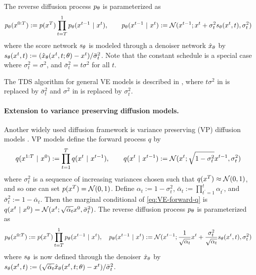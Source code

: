 The reverse diffusion process $p_{\theta}$ is parameterized as  
\begin{align}
    p_{\theta}(x^{0:T}) :=p(x^{T}) \prod_{t=T}^{1}p_{\theta}(x^{t-1} ~\vert~ x^{t}), \qquad 
    p_{\theta}(x^{t-1} ~\vert~ x^{t} ) := \mathcal{N}(x^{t-1}; x^{t} + \sigma_t^2 s_\theta (x^{t}, t), \sigma_t^2)
\end{align}
where the score network $s_\theta$ is modeled through a denoiser network ${\hat x}_\theta$ by $s_\theta(x^{t}, t) := ({\hat x}_\theta (x^{t}, t; \theta) - x^{t} )/\bar \sigma_t^2$.
Note that the constant schedule is a special case where $\sigma_t^2=\sigma^2$, and $\bar \sigma_t^2=t\sigma^2$ for all $t$. 

The TDS algorithm for general VE models is described in , where $t\sigma^2$ in  is replaced by $\bar \sigma_t^2$ and $\sigma^2$ in  is replaced by $\sigma_t^2$. 



\paragraph{Extension to variance preserving diffusion models.}  Another widely used diffusion framework is variance preserving (VP) diffusion models \citep{ho2020denoising}. VP models define the forward process $q$ by 
\begin{align}\label{eq:VP-forward-q}
q(x^{1:T} ~\vert~ x^{0}):=\prod_{t=1}^T q(x^{t} ~\vert~ x^{t-1}), \qquad 
    q(x^{t} ~\vert~ x^{t-1}) := \mathcal{N}(x^{t}; \sqrt{1-\sigma_t^2}x^{t-1}, \sigma_t^2)
\end{align}
where $\sigma_t^2$ is  a sequence of increasing variances chosen such that $q(x^{T}) \approx \mathcal{N}(0,1)$, and so one can set $p(x^{T}) = \mathcal{N}(0,1)$. Define $\alpha_t := 1-\sigma_t^2$,  $\bar \alpha_t := \prod_{t^\prime=1}^t\alpha_{t^\prime}$, and $\bar \sigma_t^2:=1-\bar \alpha_t$. 
Then the marginal conditional of \cref{eq:VE-forward-q} is $q(x^{t} ~\vert~ x^{0}) = \mathcal{N}(x^{t}; \sqrt{\bar \alpha_t} x^{0}, \bar \sigma_t^2)$. The reverse diffusion process $p_{\theta}$ is parameterized as  
\begin{align}
    p_{\theta}(x^{0:T}) :=p(x^{T}) \prod_{t=T}^{1}p_{\theta}(x^{t-1} ~\vert~ x^{t}), \quad 
    p_{\theta}(x^{t-1} ~\vert~ x^{t} ) := \mathcal{N}(x^{t-1}; \frac{1}{\sqrt{\alpha_t}}x^{t} + \frac{\sigma_t^2}{\sqrt{\alpha_t}} s_\theta (x^{t}, t), \sigma_t^2)
\end{align}
where $s_\theta$ is now defined through the denoiser ${\hat x}_\theta$ by $s_\theta(x^{t}, t) := (\sqrt{\bar \alpha_t} {\hat x}_\theta (x^{t}, t; \theta) - x^{t} )/\bar \sigma_t^2$.


